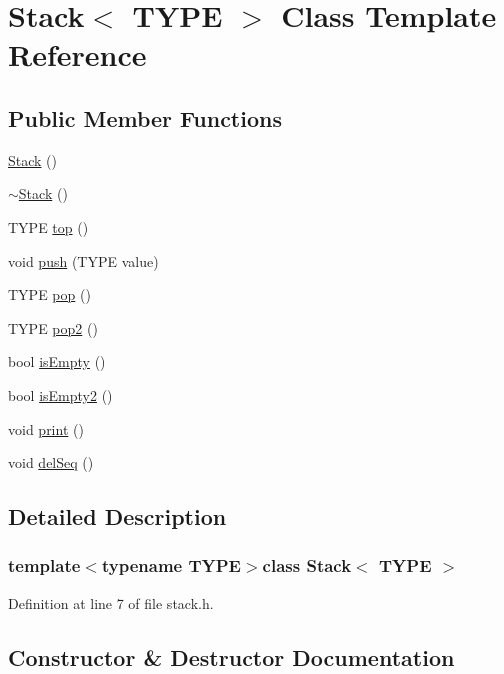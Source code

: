 \hypertarget{class_stack}{}\section{Stack$<$ T\+Y\+P\+E $>$ Class Template Reference}
\label{class_stack}
\subsection*{Public Member Functions}
\begin{DoxyCompactItemize}
\item 
\hyperlink{class_stack_a60298c4a96ea61288041d227532d24fd}{Stack} ()
\item 
\hyperlink{class_stack_ab44f11aa81222d143edb5c35cc14b88f}{$\sim$\+Stack} ()
\item 
T\+Y\+P\+E \hyperlink{class_stack_a2f28356fba216e6ac001af9508ef95db}{top} ()
\item 
void \hyperlink{class_stack_a3bbc196e781216344c2f2907f04a9eb9}{push} (T\+Y\+P\+E value)
\item 
T\+Y\+P\+E \hyperlink{class_stack_a2705b0f7ebcad637badc7d79e719a4cb}{pop} ()
\item 
T\+Y\+P\+E \hyperlink{class_stack_ab21536b68dc524eb56d7051b373b706d}{pop2} ()
\item 
bool \hyperlink{class_stack_a6d7d416cd3d6ec80209a849518c008de}{is\+Empty} ()
\item 
bool \hyperlink{class_stack_a0d0560bc5c06c075be60386afddebcc7}{is\+Empty2} ()
\item 
void \hyperlink{class_stack_a4b3bb902990e0ed945e099805d195506}{print} ()
\item 
void \hyperlink{class_stack_acacca8d1f00b2a310b7ad6a8284bcb3a}{del\+Seq} ()
\end{DoxyCompactItemize}


\subsection{Detailed Description}
\subsubsection*{template$<$typename T\+Y\+P\+E$>$class Stack$<$ T\+Y\+P\+E $>$}



Definition at line 7 of file stack.\+h.



\subsection{Constructor \& Destructor Documentation}
\hypertarget{class_stack_a60298c4a96ea61288041d227532d24fd}{}
